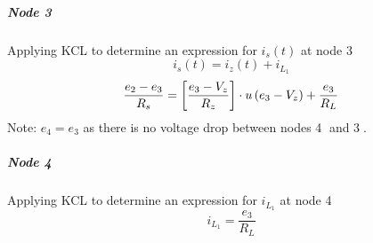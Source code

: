\subparagraph{Node \textcircled{3}}
Applying KCL to determine an expression for $i_s(t)$ at node \textcircled{3}
\begin{equation}
    i_s(t) = i_z(t) + i_{L_1}
\end{equation}
\begin{equation}
    \frac{e_2-e_3}{R_s}= \left[\frac{e_3 - V_z}{R_z} \right]\cdot u\left(e_3 - V_z \right) +\frac{e_3}{R_L}
\end{equation}
Note: $e_4 = e_3$ as there is no voltage drop between nodes \textcircled{4} and \textcircled{3}.

\subparagraph{Node \textcircled{4}}
Applying KCL to determine an expression for $i_{L_1}$ at node \textcircled{4}
\begin{equation}
	i_{L_1} = \frac{e_3}{R_L}
\end{equation}


